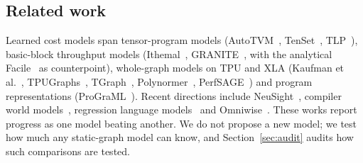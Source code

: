 \subsection{Related work}
\label{sec:related}
Learned cost models span tensor-program models (AutoTVM~\cite{chen2018learning},
TenSet~\cite{zheng2021tenset}, TLP~\cite{zhai2022deep}), basic-block throughput models
(Ithemal~\cite{mendis2019ithemal}, GRANITE~\cite{sykora2022granite}, with the analytical
Facile~\cite{abel2023facile} as counterpoint), whole-graph models on TPU and XLA (Kaufman et
al.~\cite{kaufman2021learned}, TPUGraphs~\cite{phothilimthana2023tpugraphs},
TGraph~\cite{khizbullin2024graph}, Polynormer~\cite{deng2024polynormer},
PerfSAGE~\cite{chai2023perfsage}) and program representations (ProGraML~\cite{cummins2021programl}).
Recent directions include NeuSight~\cite{lee2024forecasting}, compiler world
models~\cite{pan2026toward}, regression language models~\cite{akhauri2025regression} and
Omniwise~\cite{wang2025omniwise}. These works report progress as one model beating another. We do not
propose a new model; we test how much any static-graph model can know, and Section~\ref{sec:audit}
audits how such comparisons are tested.
